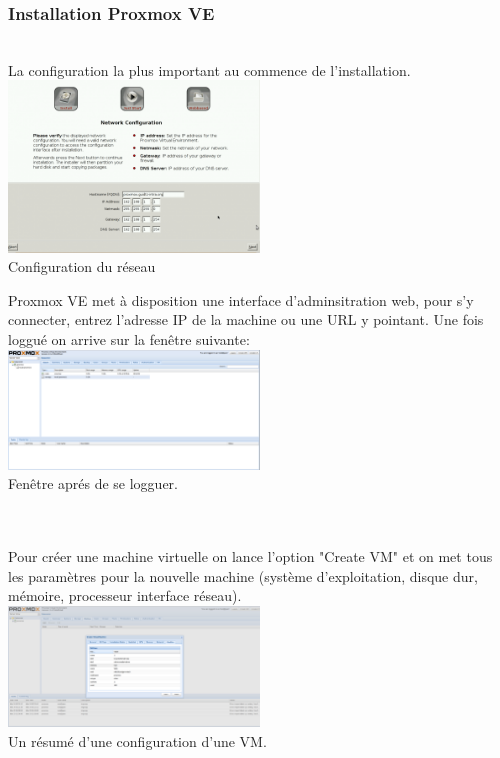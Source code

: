 \documentclass[a4paper,11pt]{report}
\begin{document}
\subsubsection{Installation Proxmox VE}\\
La configuration la plus important au commence de l'installation.\\
\includegraphics[width=0.5\textwidth]{img/installation.png}\\
\caption{Configuration du réseau }


Proxmox VE met à disposition une interface d’adminsitration web, pour s’y connecter, entrez l’adresse IP de la machine ou une URL y pointant. Une fois loggué on arrive sur la fenêtre suivante:\\
\includegraphics[width=0.5\textwidth]{img/premiere.png}\\
\caption{Fenêtre aprés de se logguer. }\\

\\
Pour créer une machine virtuelle on lance l'option "Create VM" et on met tous les paramètres pour la nouvelle machine (système d'exploitation, disque dur, mémoire, processeur interface réseau).\\
\includegraphics[width=0.5\textwidth]{img/creation-VM.png}\\
\caption{Un résumé d'une configuration d'une VM. }\\
\end{document}
